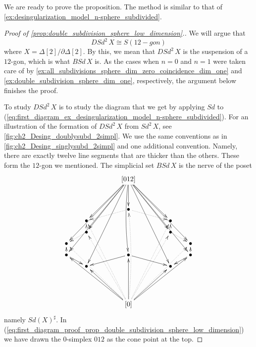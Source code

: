 We are ready to prove the proposition. The method is similar to that of \cref{ex:desingularization_model_n-sphere_subdivided}.
\begin{proof}[Proof of \cref{prop:double_subdivision_sphere_low_dimension}.]
We will argue that
\begin{equation}
\label{eq:first_expression_proof_of_prop_double_subdivision_sphere_low_dimension}
DSd^2\, X\cong S(12-gon)
\end{equation}
where $X=\Delta [2]/\partial \Delta [2]$. By this, we mean that $DSd^2\, X$ is the suspension of a $12$-gon, which is what $BSd\, X$ is. As the cases when $n=0$ and $n=1$ were taken care of by \cref{ex:all_subdivisions_sphere_dim_zero_coincidence_dim_one} and \cref{ex:double_subdivision_sphere_dim_one}, respectively, the argument below finishes the proof.

To study $DSd^2\, X$ is to study the diagram that we get by applying $Sd$ to (\ref{eq:first_diagram_ex_desingularization_model_n-sphere_subdivided}). For an illustration of the formation of $DSd^2\, X$ from $Sd^2\, X$, see \cref{fig:ch2_Desing_doublysubd_2simpl}. We use the same conventions as in \cref{fig:ch2_Desing_singlysubd_2simpl} and one additional convention. Namely, there are exactly twelve line segments that are thicker than the others. These form the $12$-gon we mentioned. The simplicial set $BSd\, X$ is the nerve of the poset
\begin{equation}
\label{eq:first_diagram_proof_prop_double_subdivision_sphere_low_dimension}
\begin{gathered}
\xymatrix@=0.6em{
&&&&&& [012] \\
\\
\\
&&&&&& \bullet \ar@{..>}[lllld] \ar@{<-}[uuu] \ar@/^0.3pc/@{<..}[ddddddddd] \ar@{..>}[drrrr] \\
&& \bullet \ar@{<..}[ddddddddrrrr] \ar@{<-}[uuuurrrr] &&&&&&&& \bullet \ar@{<..}[lllldddddddd] \ar@{<-}[lllluuuu] \\
&& \bullet \ar@{..>}[lld] \ar@{<..}[dddddddrrrr] \ar@{..>}[u] \ar@{<-}[uuuuurrrr] &&&&&&&& \bullet \ar@{<-}[lllluuuuu] \ar@{..>}[u] \ar@{<..}[llllddddddd] \ar@{..>}[drr] \\
\bullet \ar@{<..}[ddddddrrrrrr] \ar@{<-}[uuuuuurrrrrr] &&&&&&&&&&&& \bullet \ar@{<-}[lllllluuuuuu] \ar@{<..}[lllllldddddd] \\
\bullet \ar[u] \ar@{<-}[dddddrrrrrr] \ar@{<-}[uuuuuuurrrrrr] \ar[drr] &&&&&& \bullet \ar[lllld] \ar@/^0.3pc/@{<-}[uuuuuuu] \ar[drrrr] &&&&&& \bullet \ar[lld] \ar@{<-}[llllllddddd] \ar@{<-}[lllllluuuuuuu] \ar[u] \\
&& \bullet \ar@{<-}[ddddrrrr] \ar@{<-}[uuuuuuuurrrr] &&&&&&&& \bullet \ar@{<-}[lllluuuuuuuu] \ar@{<-}[lllldddd] \\
\\
\\
\\
&&&&&& [0] \ar[uuuuu]
}
\end{gathered}
\end{equation}
namely $Sd(X)^\sharp$. In (\ref{eq:first_diagram_proof_prop_double_subdivision_sphere_low_dimension}) we have drawn the $0$-simplex $012$ as the cone point at the top.


\end{proof}
